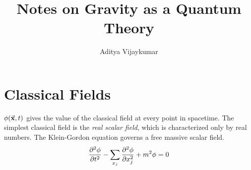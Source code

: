 \documentclass[a4paper,11pt]{article}
\title{\textbf{Notes on Gravity as a Quantum Theory}}
\author{Aditya Vijaykumar}
\affiliation{International Centre for Theoretical Sciences, Bengaluru, India.}
\begin{document}
\maketitle \tableofcontents

\section{Classical Fields}
$\phi(\va{x},t)$ gives the value of the classical field at every point in spacetime. The simplest classical field is the \textit{real scalar field}, which is characterized only by real numbers. The Klein-Gordon equation governs a free massive scalar field.
$$\pdv[2]{\phi}{t} - \sum_{x_j} \pdv[2]{\phi}{x_j} + m^2 \phi =0 $$
\end{document}
